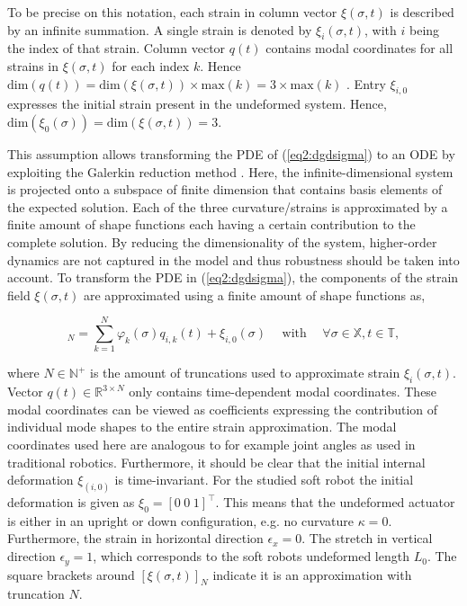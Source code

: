 To be precise on this notation, each strain in column vector $\xi(\sigma,t)$ is described by an infinite summation. A single strain is denoted by $\xi_i(\sigma,t)$, with $i$ being the index of that strain. Column vector $q(t)$ contains modal coordinates for all strains in $\xi(\sigma,t)$ for each index $k$. Hence $\text{dim}(q(t)) = \text{dim}(\xi(\sigma,t)) \times \text{max}(k) = 3 \times \text{max}(k)$ . Entry $\xi_{i,0}$ expresses the initial strain present in the undeformed system. Hence, $\text{dim}(\xi_0(\sigma)) = \text{dim}(\xi(\sigma,t))=3$.

This assumption allows transforming the PDE of (\ref{eq2:dgdsigma}) to an ODE by exploiting the Galerkin reduction method \cite{Galerkin}. Here, the infinite-dimensional system is projected onto a subspace of finite dimension that contains basis elements of the expected solution. Each of the three curvature/strains is approximated by a finite amount of shape functions each having a certain contribution to the complete solution. By reducing the dimensionality of the system, higher-order dynamics are not captured in the model and thus robustness should be taken into account. To transform the PDE in (\ref{eq2:dgdsigma}), the components of the strain field $\xi(\sigma,t)$ are approximated using a finite amount of shape functions as,

\begin{equation}
    [\xi_i(\sigma,t)]_N = \sum_{k=1}^N \varphi_k(\sigma)q_{i,k}(t) + \xi_{i,0}(\sigma) \hspace{15pt} \text{with} \hspace{15pt} \forall \sigma \in \mathbb{X}, t \in \mathbb{T},
    \label{eq2:strainapprox}
\end{equation}

where $N \in \mathbb{N}^+$ is the amount of truncations used to approximate strain $\xi_i(\sigma,t)$. Vector $q(t) \in \mathbb{R}^{3 \times N}$ only contains time-dependent modal coordinates. These modal coordinates can be viewed as coefficients expressing the contribution of individual mode shapes to the entire strain approximation. The modal coordinates used here are analogous to for example joint angles as used in traditional robotics. Furthermore, it should be clear that the initial internal deformation $\xi_{(i,0)}$ is time-invariant. For the studied soft robot the initial deformation is given as $\xi_0 = [0 \hspace{3pt} 0 \hspace{3pt} 1]^\top$. This means that the undeformed actuator is either in an upright or down configuration, e.g. no curvature $\kappa = 0$. Furthermore, the strain in horizontal direction $\epsilon_x = 0$. The stretch in vertical direction $\epsilon_y = 1$, which corresponds to the soft robots undeformed length $L_0$. The square brackets around $[\xi(\sigma,t)]_N$ indicate it is an approximation with truncation $N$. 

